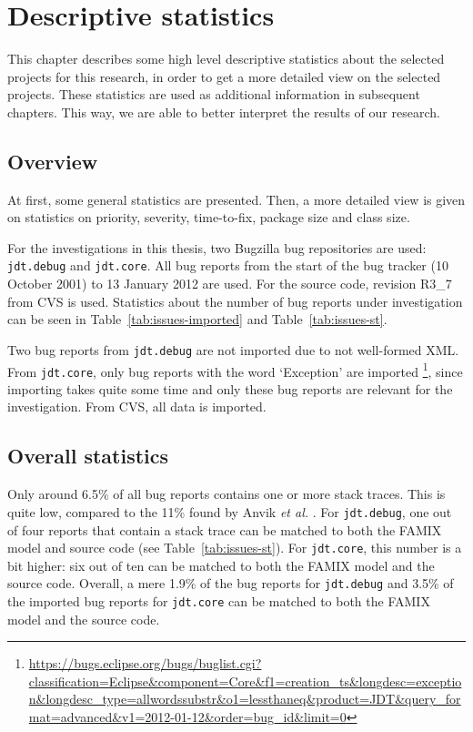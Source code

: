 
\chapter{Descriptive statistics} %
\label{cha:descriptive_statistics}

This chapter describes some high level descriptive statistics about the selected projects for this research, in order to get a more detailed view on the selected projects. These statistics are used as additional information in subsequent chapters. This way, we are able to better interpret the results of our research. 

\section{Overview} %
At first, some general statistics are presented. Then, a more detailed view is given on statistics on priority, severity, time-to-fix, package size and class size.

For the investigations in this thesis, two Bugzilla bug repositories are used: \texttt{jdt.debug} and \texttt{jdt.core}. All bug reports from the start of the bug tracker (10 October 2001) to 13 January 2012 are used. For the source code, revision R3\_7 from CVS is used. Statistics about the number of bug reports under investigation can be seen in Table~\ref{tab:issues-imported} and Table~\ref{tab:issues-st}. 

Two bug reports from \texttt{jdt.debug} are not imported due to not well-formed XML. From \texttt{jdt.core}, only bug reports with the word `Exception' are imported \footnote{\url{https://bugs.eclipse.org/bugs/buglist.cgi?classification=Eclipse&component=Core&f1=creation_ts&longdesc=exception&longdesc_type=allwordssubstr&o1=lessthaneq&product=JDT&query_format=advanced&v1=2012-01-12&order=bug_id&limit=0}}, since importing takes quite some time and only these bug reports are relevant for the investigation. From CVS, all data is imported.

\section{Overall statistics} %
Only around 6.5\% of all bug reports contains one or more stack traces. This is quite low, compared to the 11\% found by Anvik \emph{et al.} \cite{Anvik2006}. For \texttt{jdt.debug}, one out of four reports that contain a stack trace can be matched to both the FAMIX model and source code (see Table~\ref{tab:issues-st}). For \texttt{jdt.core}, this number is a bit higher: six out of ten can be matched to both the FAMIX model and the source code. Overall, a mere 1.9\% of the bug reports for \texttt{jdt.debug} and 3.5\% of the imported bug reports for \texttt{jdt.core} can be matched to both the FAMIX model and the source code.

